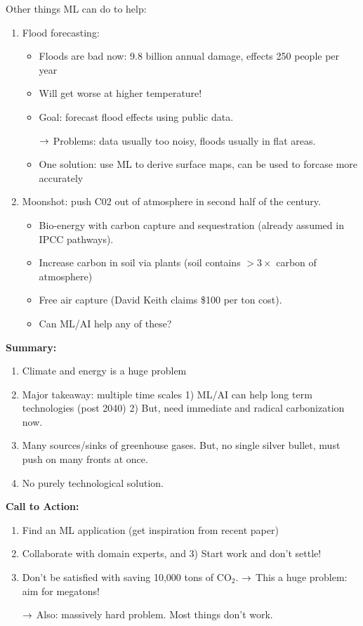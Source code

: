 Other things ML can do to help:
\begin{enumerate}
    \item Flood forecasting:
    \begin{itemize}
        \item Floods are bad now: 9.8 billion annual damage, effects 250 people per year
        \item Will get worse at higher temperature!
        \item Goal: forecast flood effects using public data.
        
        $\rightarrow$ Problems: data usually too noisy, floods usually in flat areas.
        
        \item One solution: use ML to derive surface maps, can be used to forcase more accurately
    \end{itemize}
    \item Moonshot: push C02 out of atmosphere in second half of the century.
    \begin{itemize}
        \item Bio-energy with carbon capture and sequestration (already assumed in IPCC pathways).
        \item Increase carbon in soil via plants (soil contains $>3\times$ carbon of atmosphere)
        \item Free air capture (David Keith claims \$100 per ton cost).
        \item Can ML/AI help any of these?
    \end{itemize}
\end{enumerate}


{\bf Summary:}
\begin{enumerate}
    \item Climate and energy is a huge problem
    \item Major takeaway: multiple time scales
        1) ML/AI can help long term technologies (post 2040)
        2) But, need immediate and radical carbonization now.
    \item Many sources/sinks of greenhouse gases. But, no single silver bullet, must push on many fronts at once.
    \item No purely technological solution.
\end{enumerate}


{\bf Call to Action:}
\begin{enumerate}
    \item Find an ML application (get inspiration from recent paper)
    \item Collaborate with domain experts, and 3) Start work and don't settle!
    \item Don't be satisfied with saving 10,000 tons of CO$_2$.
    $\rightarrow$ This a huge problem: aim for megatons!

    $\rightarrow$ Also: massively hard problem. Most things don't work.
\end{enumerate}

